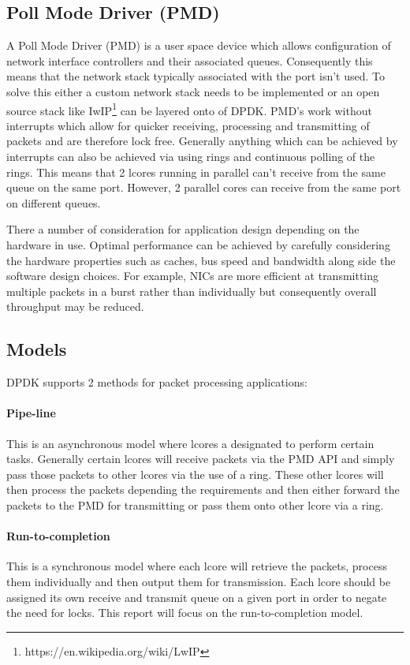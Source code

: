 \documentclass[final_report.tex]{subfiles}
\begin{document}
\subsection{Poll Mode Driver (PMD)}
A Poll Mode Driver (PMD) is a user space device which allows configuration of network interface controllers and their associated queues. Consequently this means that the network stack typically associated with the port isn't used. To solve this either a custom network stack needs to be implemented or an open source stack like IwIP\footnote{https://en.wikipedia.org/wiki/LwIP} can be layered onto of DPDK. PMD's work without interrupts which allow for quicker receiving, processing and transmitting of packets and are therefore lock free. Generally anything which can be achieved by interrupts can also be achieved via using rings and continuous polling of the rings. This means that 2 lcores running in parallel can't receive from the same queue on the same port. However, 2 parallel cores can receive from the same port on different queues.

There a number of consideration for application design depending on the hardware in use. Optimal performance can be achieved by carefully considering the hardware properties such as caches, bus speed and bandwidth along side the software design choices. For example, NICs are more efficient at transmitting multiple packets in a burst rather than individually but consequently overall throughput may be reduced.

\subsection{Models}
DPDK supports 2 methods for packet processing applications:

\paragraph*{Pipe-line}
This is an asynchronous model where lcores a designated to perform certain tasks. Generally certain lcores will receive packets via the PMD API and simply pass those packets to other lcores via the use of a ring. These other lcores will then process the packets depending the requirements and then either forward the packets to the PMD for transmitting or pass them onto other lcore via a ring.

\paragraph*{Run-to-completion}
This is a synchronous model where each lcore will retrieve the packets, process them individually and then output them for transmission. Each lcore should be assigned its own receive and transmit queue on a given port in order to negate the need for locks. This report will focus on the run-to-completion model.
\end{document}
